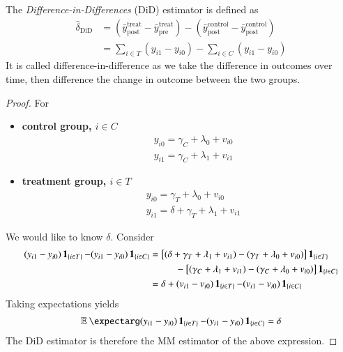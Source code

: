             \begin{definition}
                The \textit{Difference-in-Differences} (DiD) estimator is defined as
                \begin{align}
                    \hat\delta_\text{DiD}
                        &= \left(\bar y_\text{post}^\text{treat}-\bar y_\text{pre}^\text{treat}\right)-\left(\bar y_\text{post}^\text{control}-\bar y_\text{post}^\text{control}\right)\\
                        &=\sum_{i\in T} (y_{i1} - y_{i0}) - \sum_{i\in C} (y_{i1} - y_{i0})
                \end{align}
                It is called difference-in-difference as we take the difference in outcomes over time, then difference the change in outcome between the two groups.
            \end{definition}
            \begin{proof}
                For
                \begin{itemize}
                    \item \textbf{control group, $i\in C$}
                    \begin{align}
                        & y_{i0} = \gamma_C + \lambda_0 + v_{i0}   \\
                        & y_{i1} = \gamma_C + \lambda_1 + v_{i1}   
                    \end{align}
                    \item \textbf{treatment group, $i\in T$}
                    \begin{align}
                        & y_{i0} = \gamma_T + \lambda_0 + v_{i0}   \\
                        & y_{i1} = \delta + \gamma_T + \lambda_1 + v_{i1}   
                    \end{align}
                \end{itemize}
                We would like to know $\delta$. Consider
                \begin{align}
                    (y_{i1} - y_{i0})\ind_{i\in T} - (y_{i1} - y_{i0})\ind_{i\in C}
                        &= \left[(\delta + \gamma_T + \lambda_1 + v_{i1})- (\gamma_T + \lambda_0 + v_{i0})\right]\ind_{i\in T}\nonumber\\
                        &\phantom{=}\qquad  - \left[(\gamma_C + \lambda_1 + v_{i1}) - (\gamma_C + \lambda_0 + v_{i0})\right]\ind_{i\in C}     \\
                        &= \delta + (v_{i1} - v_{i0})\ind_{i\in T} - (v_{i1} - v_{i0})\ind_{i\in C}
                \end{align}
                Taking expectations yields
                \begin{align}
                    \expect{(y_{i1} - y_{i0})\ind_{i\in T} - (y_{i1} - y_{i0})\ind_{i\in C}} = \delta
                \end{align}
                The DiD estimator is therefore the MM estimator of the above expression.
            \end{proof}

